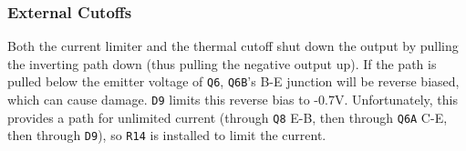 \begin{multicols}{2}
\subsubsection{External Cutoffs}
Both the current limiter and the thermal cutoff shut down the output by
pulling the inverting path down (thus pulling the negative output up). If the
path is pulled below the emitter voltage of \texttt{Q6}, \texttt{Q6B}'s B-E
junction will be reverse biased, which can cause damage. \texttt{D9} limits
this reverse bias to -0.7\;V. Unfortunately, this provides a path for
unlimited current (through \texttt{Q8} E-B, then through \texttt{Q6A} C-E,
then through \texttt{D9}), so \texttt{R14} is installed to limit the current.

\end{multicols}
